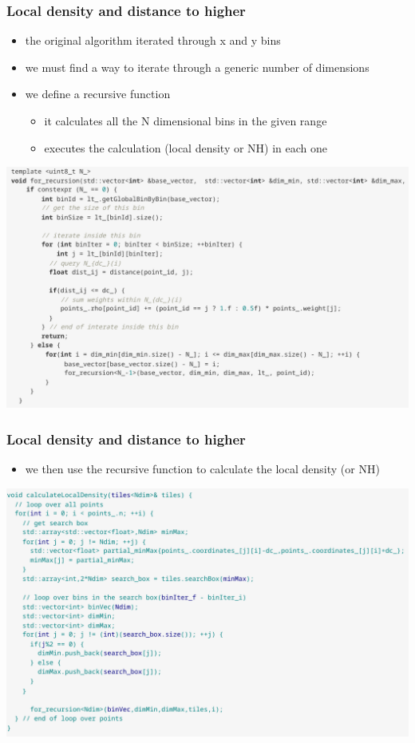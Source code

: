 \documentclass{beamer}
\begin{document}
\begin{frame}
\frametitle{Local density and distance to higher}
\begin{itemize}
	\item the original algorithm iterated through x and y bins
	\item we must find a way to iterate through a generic number of dimensions 
	\item we define a recursive function
		\begin{itemize}
			\item it calculates all the N dimensional bins in the given range
			\item executes the calculation (local density or NH) in each one
		\end{itemize}
\end{itemize}
\begin{center}
	\includegraphics[scale=0.3]{recursion.png}
\end{center}	
\end{frame}
\begin{frame}
\frametitle{Local density and distance to higher}
\begin{itemize}
	\item we then use the recursive function to calculate the local density (or NH)
\end{itemize}
\begin{center}
	\includegraphics[scale=0.3]{localdensity.png}
\end{center}
\end{frame}
\end{document}
